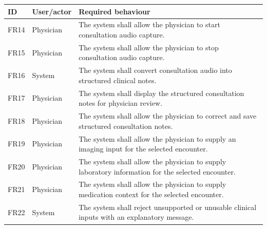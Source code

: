 \begin{reporttable}
\centering
\small
\caption{Consultation recording and clinical inputs.}
\label{tab:kashaf:fr-input}
\begin{tabular}{|p{}|p{}|p{}|}
\hline
ID & User/actor & Required behaviour \\ \hline
FR14 & Physician & The system shall allow the physician to start consultation audio capture. \\ \hline
FR15 & Physician & The system shall allow the physician to stop consultation audio capture. \\ \hline
FR16 & System & The system shall convert consultation audio into structured clinical notes. \\ \hline
FR17 & Physician & The system shall display the structured consultation notes for physician review. \\ \hline
FR18 & Physician & The system shall allow the physician to correct and save structured consultation notes. \\ \hline
FR19 & Physician & The system shall allow the physician to supply an imaging input for the selected encounter. \\ \hline
FR20 & Physician & The system shall allow the physician to supply laboratory information for the selected encounter. \\ \hline
FR21 & Physician & The system shall allow the physician to supply medication context for the selected encounter. \\ \hline
FR22 & System & The system shall reject unsupported or unusable clinical inputs with an explanatory message. \\ \hline
\end{tabular}
\end{reporttable}

